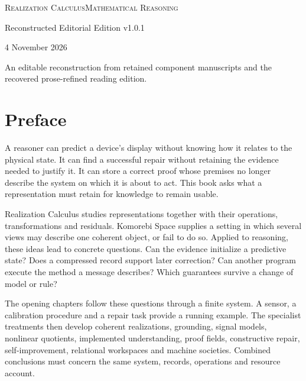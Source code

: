 \documentclass[11pt,oneside,openany]{book}
\numberwithin{equation}{section}
\begin{document}
\frontmatter
\hypersetup{pageanchor=false}
\begin{titlepage}\thispagestyle{empty}
{\small\scshape Realization Calculus\hfill Mathematical Reasoning}\par
{}
\vspace{.3in}{\Large Representation, Inference, Discovery, and Self-Correction\par}
\vspace{.4in}{\color{Accent}\rule{1.9in}{2pt}}\par
\vspace{.4in}{\Large Komorebi P.\par}\vfill
{\Large Reconstructed Editorial Edition v1.0.1\par}\medskip
{4 November 2026\par}\medskip
{\small An editable reconstruction from retained component manuscripts and the recovered prose-refined reading edition.}\par
\end{titlepage}
\hypersetup{pageanchor=true}
\chapter{Preface}
A reasoner can predict a device's display without knowing how it relates to the physical state. It can find a successful repair without retaining the evidence needed to justify it. It can store a correct proof whose premises no longer describe the system on which it is about to act. This book asks what a representation must retain for knowledge to remain usable.

Realization Calculus studies representations together with their operations, transformations and residuals. Komorebi Space supplies a setting in which several views may describe one coherent object, or fail to do so. Applied to reasoning, these ideas lead to concrete questions. Can the evidence initialize a predictive state? Does a compressed record support later correction? Can another program execute the method a message describes? Which guarantees survive a change of model or rule?

The opening chapters follow these questions through a finite system. A sensor, a calibration procedure and a repair task provide a running example. The specialist treatments then develop coherent realizations, grounding, signal models, nonlinear quotients, implemented understanding, proof fields, constructive repair, self-improvement, relational workspaces and machine societies. Combined conclusions must concern the same system, records, operations and resource account.
\end{document}

